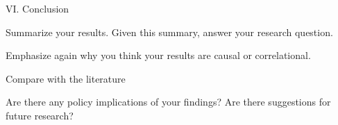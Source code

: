 \documentclass{./../Lectures/div_teaching_slides}
\begin{document}
\begin{frame}{}
\centering \small

\end{frame}


\begin{frame}{VI. Conclusion}
\begin{witemize}
  \item Summarize your results. Given this summary, answer your research question.
  \item Emphasize again why you think your results are causal or correlational.
  \item Compare with the literature
  \item Are there any policy implications of your findings? Are there suggestions for future research?
\end{witemize}
\end{frame}
\end{document}
